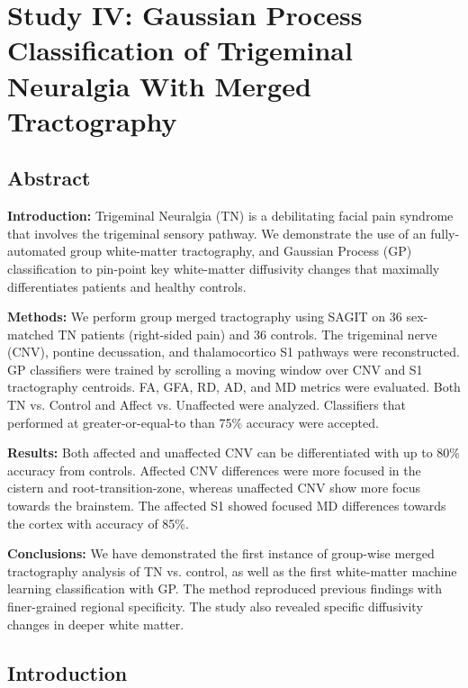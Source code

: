 \graphicspath{{images/tn-gp-sagit/drafts/}}

\chapter{Study IV: Gaussian Process Classification of Trigeminal Neuralgia With Merged Tractography}

\section{Abstract}
\textbf{Introduction:} Trigeminal Neuralgia (TN) is a debilitating facial pain syndrome that involves the trigeminal sensory pathway. We demonstrate the use of an fully-automated group white-matter tractography, and Gaussian Process (GP) classification to pin-point key white-matter diffusivity changes that maximally differentiates patients and healthy controls. 

\textbf{Methods:} We perform group merged tractography using SAGIT on 36 sex-matched TN patients (right-sided pain) and 36 controls. The trigeminal nerve (CNV), pontine decussation, and thalamocortico S1 pathways were reconstructed. GP classifiers were trained by scrolling a moving window over CNV and S1 tractography centroids. FA, GFA, RD, AD, and MD metrics were evaluated. Both TN vs. Control and Affect vs. Unaffected were analyzed. Classifiers that performed at greater-or-equal-to than 75\% accuracy were accepted.

\textbf{Results:} Both affected and unaffected CNV can be differentiated with up to 80\% accuracy from controls. Affected CNV differences were more focused in the cistern and root-transition-zone, whereas unaffected CNV show more focus towards the brainstem. The affected S1 showed focused MD differences towards the cortex with accuracy of 85\%. 

\textbf{Conclusions:} We have demonstrated the first instance of group-wise merged tractography analysis of TN vs. control,  as well as the first white-matter machine learning classification with GP. The method reproduced previous findings with finer-grained regional specificity. The study also revealed specific diffusivity changes in deeper white matter.

\section{Introduction}
